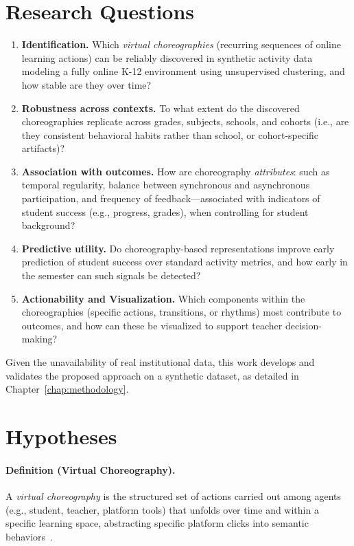 \section{Research Questions} \label{sec:rqs}
\begin{enumerate}
  \item[\textbf{RQ1}] \textbf{Identification.} Which \emph{virtual choreographies} (recurring sequences of online learning actions) can be reliably discovered in synthetic activity data modeling a fully online K-12 environment using unsupervised clustering, and how stable are they over time?
  \item[\textbf{RQ2}] \textbf{Robustness across contexts.} To what extent do the discovered choreographies replicate across grades, subjects, schools, and cohorts (i.e., are they consistent behavioral habits rather than school, or cohort-specific artifacts)?
  \item[\textbf{RQ3}] \textbf{Association with outcomes.} How are choreography \emph{attributes}: such as temporal regularity, balance between synchronous and asynchronous participation, and frequency of feedback—associated with indicators of student success (e.g., progress, grades), when controlling for student background?
  \item[\textbf{RQ4}] \textbf{Predictive utility.} Do choreography-based representations improve early prediction of student success over standard activity metrics, and how early in the semester can such signals be detected?
  \item[\textbf{RQ5}] \textbf{Actionability and Visualization.} Which components within the choreographies (specific actions, transitions, or rhythms) most contribute to outcomes, and how can these be visualized to support teacher decision-making?
\end{enumerate}

Given the unavailability of real institutional data, this work develops and validates the proposed approach on a synthetic dataset, as detailed in Chapter~\ref{chap:methodology}.
  

\section{Hypotheses} \label{sec:hypotheses}

\paragraph{Definition (Virtual Choreography).}
A \emph{virtual choreography} is the structured set of actions carried out among agents (e.g., student, teacher, platform tools) that unfolds over time and within a specific learning space, abstracting specific platform clicks into semantic behaviors~\cite{cassola_using_2022}.

